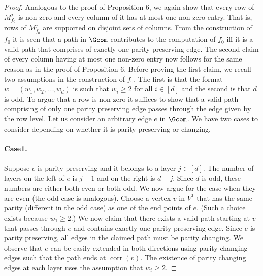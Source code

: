 \begin{proof}
Analogous to the proof of Proposition 6, we again show that every row of $M^j_{f_0}$ is non-zero and every column of it has at most one non-zero entry. That is, rows of $M^j_{f_0}$ are supported on disjoint sets of columns.
From the construction of $f_0$ it is seen that a path in $\Gcom$ contributes to the computation of $f_0$ iff it is a valid path that comprises of exactly one parity preserving edge. The second claim of every column having at most one non-zero entry now follows for the same reason as in the proof of Proposition 6.
Before proving the first claim, we recall two assumptions in the construction of $f_0$. The first is that the format $w=(w_1,w_2,\ldots,w_d)$ is such that $w_i\ge2$ for all $i\in[d]$ and the second is that $d$ is odd. To argue that a row is non-zero it suffices to show that a valid path comprising of only one parity preserving edge passes through the edge given by the row level.
Let us consider an arbitrary edge $e$ in $\Gcom$. We have two cases to consider depending on whether it is parity preserving or changing.
\paragraph{Case1.} Suppose $e$ is parity preserving and it belongs to a layer $j\in[d]$. The number of layers on the left of $e$ is $j-1$ and on the right is $d-j$. Since $d$ is odd, these numbers are either both even or both odd. We now argue for the case when they are even (the odd case is analogous). Choose a vertex $v$ in $V^1$ that has the same parity (different in the odd case) as one of the end points of $e$. (Such a choice exists because $w_1\ge2$.) We now claim that there exists a valid path starting at $v$ that passes through $e$ and contains exactly one parity preserving edge. Since $e$ is parity preserving, all edges in the claimed path must be parity changing. We observe that $e$ can be easily extended in both directions using parity changing edges such that the path ends at $\operatorname{corr}(v)$. The existence of parity changing edges at each layer uses the assumption that $w_i\ge2$.

\end{proof}
